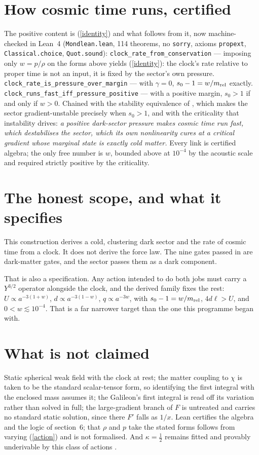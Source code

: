 \documentclass[11pt,letterpaper]{article}
\begin{document}
\section{How cosmic time runs, certified}
The positive content is (\ref{identity}) and what follows from it, now machine-checked in Lean~4 (\texttt{Mondlean.lean}, 114 theorems, no \texttt{sorry}, axioms \texttt{propext}, \texttt{Classical.choice}, \texttt{Quot.sound}):
\texttt{clock\_rate\_from\_conservation} --- imposing only $w=p/\rho$ on the forms above yields (\ref{identity}): the clock's rate relative to proper time is not an input, it is fixed by the sector's own pressure.
\texttt{clock\_rate\_is\_pressure\_over\_margin} --- with $\gamma=0$, $s_0-1=w/m_{\rm rel}$ exactly.
\texttt{clock\_runs\_fast\_iff\_pressure\_positive} --- with a positive margin, $s_0>1$ if and only if $w>0$.
Chained with the stability equivalence of \cite{paper19}, which makes the sector gradient-unstable precisely when $s_0>1$, and with the criticality that instability drives: \emph{a positive dark-sector pressure makes cosmic time run fast, which destabilises the sector, which its own nonlinearity cures at a critical gradient whose marginal state is exactly cold matter.} Every link is certified algebra; the only free number is $w$, bounded above at $10^{-4}$ by the acoustic scale \cite{paper21} and required strictly positive by the criticality.

\section{The honest scope, and what it specifies}
This construction derives a cold, clustering dark sector and the rate of cosmic time from a clock. It does not derive the force law. The nine gates passed in \cite{paper19,paper20,paper21,paper22} are dark-matter gates, and the sector passes them as a dark component.

That is also a specification. Any action intended to do both jobs must carry a $Y^{3/2}$ operator alongside the clock, and the derived family fixes the rest: $U\propto a^{-3(1+w)}$, $d\propto a^{-3(1-w)}$, $q\propto a^{-3w}$, with $s_0-1=w/m_{\rm rel}$, $4d\ell>U$, and $0<w\lesssim10^{-4}$. That is a far narrower target than the one this programme began with.

\section{What is not claimed}
Static spherical weak field with the clock at rest; the matter coupling to $\chi$ is taken to be the standard scalar-tensor form, so identifying the first integral with the enclosed mass assumes it; the Galileon's first integral is read off its variation rather than solved in full; the large-gradient branch of $F$ is untreated and carries no standard static solution, since there $F'$ falls as $1/x$. Lean certifies the algebra and the logic of section~6; that $\rho$ and $p$ take the stated forms follows from varying (\ref{action}) and is not formalised. And $\kappa=\tfrac12$ remains fitted and provably underivable by this class of actions \cite{repo}.
\end{document}
